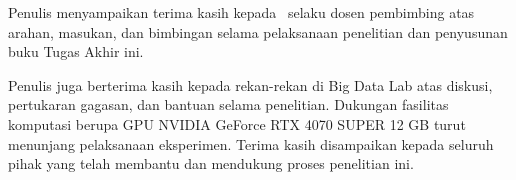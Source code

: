 
Penulis menyampaikan terima kasih kepada \PembimbingSatu\ selaku dosen pembimbing atas arahan, masukan, dan bimbingan selama pelaksanaan penelitian dan penyusunan buku Tugas Akhir ini.

Penulis juga berterima kasih kepada rekan-rekan di Big Data Lab atas diskusi, pertukaran gagasan, dan bantuan selama penelitian. Dukungan fasilitas komputasi berupa GPU NVIDIA GeForce RTX 4070 SUPER 12 GB turut menunjang pelaksanaan eksperimen. Terima kasih disampaikan kepada seluruh pihak yang telah membantu dan mendukung proses penelitian ini.
